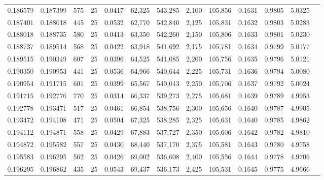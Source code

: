 \begin{tabular}{rrrrrrrrrrrrr}
0.186579 & 0.187399 &   575 &  25 &                                     0.0417 &  62,325 & 543,285 &   2,100 & 105,856 & 0.1631 & 0.9805 & 5.0325 \\
0.187401 & 0.188018 &   445 &  25 &                                     0.0532 &  62,770 & 542,840 &   2,125 & 105,831 & 0.1632 & 0.9803 & 5.0283 \\
0.188018 & 0.188735 &   580 &  25 &                                     0.0413 &  63,350 & 542,260 &   2,150 & 105,806 & 0.1633 & 0.9801 & 5.0230 \\
0.188737 & 0.189514 &   568 &  25 &                                     0.0422 &  63,918 & 541,692 &   2,175 & 105,781 & 0.1634 & 0.9799 & 5.0177 \\
0.189515 & 0.190349 &   607 &  25 &                                     0.0396 &  64,525 & 541,085 &   2,200 & 105,756 & 0.1635 & 0.9796 & 5.0121 \\
0.190350 & 0.190953 &   441 &  25 &                                     0.0536 &  64,966 & 540,644 &   2,225 & 105,731 & 0.1636 & 0.9794 & 5.0080 \\
0.190954 & 0.191715 &   601 &  25 &                                     0.0399 &  65,567 & 540,043 &   2,250 & 105,706 & 0.1637 & 0.9792 & 5.0024 \\
0.191715 & 0.192776 &   770 &  25 &                                     0.0314 &  66,337 & 539,273 &   2,275 & 105,681 & 0.1639 & 0.9789 & 4.9953 \\
0.192778 & 0.193471 &   517 &  25 &                                     0.0461 &  66,854 & 538,756 &   2,300 & 105,656 & 0.1640 & 0.9787 & 4.9905 \\
0.193472 & 0.194108 &   471 &  25 &                                     0.0504 &  67,325 & 538,285 &   2,325 & 105,631 & 0.1640 & 0.9785 & 4.9862 \\
0.194112 & 0.194871 &   558 &  25 &                                     0.0429 &  67,883 & 537,727 &   2,350 & 105,606 & 0.1642 & 0.9782 & 4.9810 \\
0.194872 & 0.195582 &   557 &  25 &                                     0.0430 &  68,440 & 537,170 &   2,375 & 105,581 & 0.1643 & 0.9780 & 4.9758 \\
0.195583 & 0.196295 &   562 &  25 &                                     0.0426 &  69,002 & 536,608 &   2,400 & 105,556 & 0.1644 & 0.9778 & 4.9706 \\
0.196295 & 0.196862 &   435 &  25 &                                     0.0543 &  69,437 & 536,173 &   2,425 & 105,531 & 0.1645 & 0.9775 & 4.9666 \\

\end{tabular}
